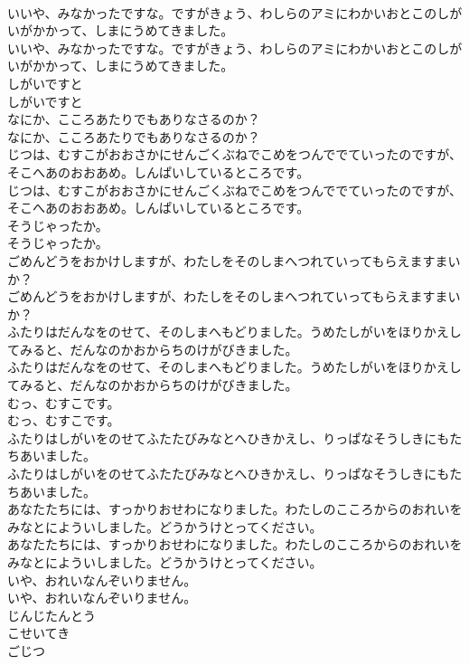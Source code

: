 \documentclass[8pt]{extreport}
\begin{document}
\begin{CJK}{UTF8}{min}
\\	いいや、みなかったですな。ですがきょう、わしらのアミにわかいおとこのしがいがかかって、しまにうめてきました。
\\	いいや、みなかったですな。ですがきょう、わしらのアミにわかいおとこのしがいがかかって、しまにうめてきました。
\\	しがいですと
\\	しがいですと
\\	なにか、こころあたりでもありなさるのか？
\\	なにか、こころあたりでもありなさるのか？
\\	じつは、むすこがおおさかにせんごくぶねでこめをつんででていったのですが、そこへあのおおあめ。しんぱいしているところです。
\\	じつは、むすこがおおさかにせんごくぶねでこめをつんででていったのですが、そこへあのおおあめ。しんぱいしているところです。
\\	そうじゃったか。
\\	そうじゃったか。
\\	ごめんどうをおかけしますが、わたしをそのしまへつれていってもらえますまいか？
\\	ごめんどうをおかけしますが、わたしをそのしまへつれていってもらえますまいか？
\\	ふたりはだんなをのせて、そのしまへもどりました。うめたしがいをほりかえしてみると、だんなのかおからちのけがびきました。
\\	ふたりはだんなをのせて、そのしまへもどりました。うめたしがいをほりかえしてみると、だんなのかおからちのけがびきました。
\\	むっ、むすこです。
\\	むっ、むすこです。
\\	ふたりはしがいをのせてふたたびみなとへひきかえし、りっぱなそうしきにもたちあいました。
\\	ふたりはしがいをのせてふたたびみなとへひきかえし、りっぱなそうしきにもたちあいました。
\\	あなたたちには、すっかりおせわになりました。わたしのこころからのおれいをみなとによういしました。どうかうけとってください。
\\	あなたたちには、すっかりおせわになりました。わたしのこころからのおれいをみなとによういしました。どうかうけとってください。
\\	いや、おれいなんぞいりません。
\\	いや、おれいなんぞいりません。
\\	じんじたんとう
\\	こせいてき
\\	ごじつ

\end{CJK}
\end{document}
